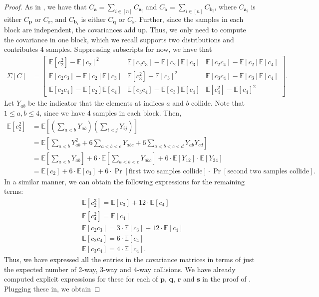 \documentclass[10pt]{article} %
\newcommand{\E}{\mathbb{E}}
\theoremstyle{plain}
\newcommand{\bp}{\textbf{p}}
\newcommand{\bq}{\textbf{q}}
\newcommand{\br}{\textbf{r}}
\newcommand{\bs}{\textbf{s}}
\newcommand{\ba}{\textbf{a}}
\newcommand{\bb}{\textbf{b}}
\begin{document}
\begin{proof}
	As in , we have that $C_{\ba} = \sum_{i \in [n]}C_{\ba_i}$ and $C_{\bb} = \sum_{i \in [n]}C_{\bb_i}$, where $C_{\ba_i}$ is either $C_{\bp}$ or $C_{\br}$, and $C_{\bb_i}$ is either $C_{\bq}$ or $C_{\bs}$. Further, since the samples in each block are independent, the covariances add up. Thus, we only need to compute the covariance in one block, which we recall supports two distributions and contributes 4 samples. Suppressing subscripts for now, we have that
	\begin{align*}
		\Sigma[C] &= 
		\begin{bmatrix}
			\E[c_2^2]-\E[c_2]^2 & \E[c_2c_3] -\E[c_2]\E[c_3] & \E[c_2c_4] - \E[c_2]\E[c_4]\\
			\E[c_2c_3] -\E[c_2]\E[c_3] & \E[c_3^2]-\E[c_3]^2 & \E[c_3c_4] -\E[c_3]\E[c_4] \\
			\E[c_2c_4] - \E[c_2]\E[c_4] & \E[c_3c_4] -\E[c_3]\E[c_4] & \E[c_4^2]-\E[c_4]^2
		\end{bmatrix}.
	\end{align*}
	Let $Y_{ab}$ be the indicator that the elements at indices $a$ and $b$ collide. Note that $1 \le a,b \le 4$, since we have 4 samples in each block. Then,
	\begin{align*}
		\E[c^2_2] &= \E\left [\left(\sum_{a < b}Y_{ab}\right)\left(\sum_{i < j}Y_{ij}\right)\right] \\
		&= \E\left[\sum_{a < b}Y_{ab}^2 + 6\sum_{a < b < c}Y_{abc} + 6\sum_{a < b < c < d}Y_{ab}Y_{cd}\right] \\
		&= \E\left[\sum_{a < b}Y_{ab}\right] + 6\cdot\E\left[\sum_{a < b < c}Y_{abc}\right] + 6\cdot\E[Y_{12}]\cdot\E[Y_{34}] \\
		&= \E[c_2] + 6\cdot\E[c_3] + 6\cdot\Pr[\text{first two samples collide}]\cdot\Pr[\text{second two samples collide}].
	\end{align*}
	In a similar manner, we can obtain the following expressions for the remaining terms:
	\begin{align*}
		&\E[c^3_2] = \E[c_3] + 12\cdot\E[c_4] \\
		&\E[c_4^2] = \E[c_4] \\
		&\E[c_2c_3] = 3\cdot\E[c_3] + 12\cdot\E[c_4] \\
		&\E[c_2c_4] = 6\cdot\E[c_4] \\
		&\E[c_3c_4] = 4\cdot\E[c_4].
	\end{align*}
	Thus, we have expressed all the entries in the covariance matrices in terms of just the expected number of 2-way, 3-way and 4-way collisions. We have already computed explicit expressions for these for each of $\bp$, $\bq$, $\br$ and $\bs$ in the proof of . Plugging these in, we obtain

\end{proof}
\end{document}
